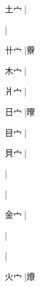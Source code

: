 \begin{multicols}{2}
{{\cjk{}土{宀}{\cnxb{}𡗜}}|{}\par
{}|{}\par
{\cjk{}卄{宀}{\cnxb{}𡗜}}|{\cjk{}藔}\par
{\cjk{}木{宀}{\cnxb{}𡗜}}|{}\par
{\cjk{}爿{宀}{\cnxb{}𡗜}}|{}\par
{\cjk{}日{宀}{\cnxb{}𡗜}}|{\cjk{}曢}\par
{\cjk{}目{宀}{\cnxb{}𡗜}}|{}\par
{\cjk{}貝{宀}{\cnxb{}𡗜}}|{}\par
{}|{}\par
{}|{}\par
{\cjk{}金{宀}{\cnxb{}𡗜}}|{}\par
{}|{}\par
{}|{}\par
{\cjk{}火{宀}{\cnxb{}𡗜}}|{\cjk{}爎}\par
}
\end{multicols}
